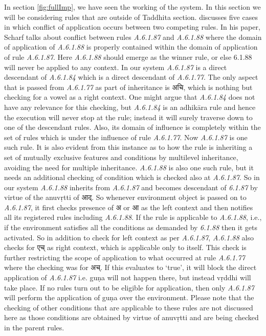 \documentclass[11pt]{article}
\begin{document}
In section \ref{fig:fullImp}, we have seen the working of the system. In this section we will be considering rules that are outside of Taddhita section.  discusses five cases in which conflict of application occurs between two competing rules. In his paper, Scharf talks about conflict between rules {\sl A.6.1.87 } and {\sl A.6.1.88} where the domain of application of {\sl A.6.1.88} is properly contained within the domain of application of rule {\sl A.6.1.87}. Here {\sl A.6.1.88} should emerge as the winner rule, or else 6.1.88 will never be applied to any context. In our system {\sl A.6.1.87} is a direct descendant of {\sl A.6.1.84} which is a direct descendant of {\sl A.6.1.77}. The only aspect that is passed from {\sl A.6.1.77} as part of inheritance is {\skt अचि}, which is nothing but checking for a vowel as a right context. One might argue that {\sl A.6.1.84} does not have any relevance for this checking, but {\sl A.6.1.84} is an adhikāra rule and hence the execution will never stop at the rule; instead it will surely traverse down to one of the descendant rules. Also, its domain of influence is completely within the set of rules which is under the influence of rule {\sl A.6.1.77}. Now {\sl A.6.1.87} is one such rule. It is also evident from this instance as to how the rule is inheriting a set of mutually exclusive features and conditions by multilevel inheritance, avoiding the need for multiple inheritance. {\sl A.6.1.88} is also one such rule, but it needs an additional checking of condition which is checked also at {\sl A.6.1.87}. So in our system {\sl A.6.1.88} inherits from {\sl A.6.1.87} and becomes descendant of {\sl 6.1.87} by virtue of the anuvṛtti of {\skt आद्}. So whenever environment object is passed on to {\sl A.6.1.87}, it first checks presence of {\skt अ or आ} as the left context and then notifies all its registered rules including {\sl A.6.1.88}. If the rule is applicable to {\sl A.6.1.88}, i.e., if the environment satisfies all the conditions as demanded by {\sl 6.1.88} then it gets activated. So in addition to check for left context as per {\sl A.6.1.87}, {\sl A.6.1.88} also checks for {\skt एच्} as right context, which is applicable only to itself. This check is further restricting the scope of application to what occurred at rule {\sl A.6.1.77} where the checking was for {\skt अच्}. If this evaluates to `true', it will block the direct application of {\sl A.6.1.87} i.e. guṇa will not happen there, but instead vṛddhi will take place. If no rules turn out to be eligible for application, then only {\sl A.6.1.87} will perform the application of guṇa over the environment. Please note that the checking of other conditions that are applicable to these rules are not discussed here as those conditions are obtained by virtue of anuvṛtti and are being checked in the parent rules.
\end{document}
